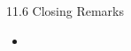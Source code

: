\begin{frame}{11.6 Closing Remarks}
    \begin{itemize}
        \item
    \end{itemize}
\end{frame}
